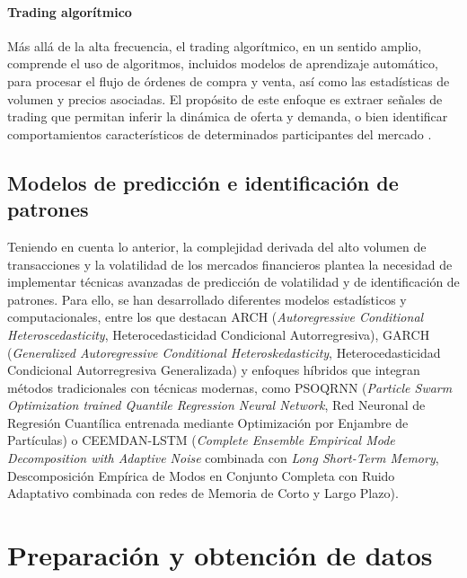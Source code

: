 \documentclass[12pt]{paper}
\begin{document}
\paragraph{Trading algorítmico}
Más allá de la alta frecuencia, el trading algorítmico, en un sentido amplio, comprende el uso de algoritmos, incluidos modelos de aprendizaje automático, para procesar el flujo de órdenes de compra y venta, así como las estadísticas de volumen y precios asociadas. El propósito de este enfoque es extraer señales de trading que permitan inferir la dinámica de oferta y demanda, o bien identificar comportamientos característicos de determinados participantes del mercado \cite{jansen2020machine}.

\subsection[Modelos de predicción e identificación de patrones]{Modelos de predicción e identificación de patrones}
\label{sec:modelos-prediccion}
Teniendo en cuenta lo anterior, la complejidad derivada del alto volumen de transacciones y la volatilidad de los mercados financieros plantea la necesidad de implementar técnicas avanzadas de predicción de volatilidad y de identificación de patrones. Para ello, se han desarrollado diferentes modelos estadísticos y computacionales, entre los que destacan ARCH (\textit{Autoregressive Conditional Heteroscedasticity}, Heterocedasticidad Condicional Autorregresiva), GARCH (\textit{Generalized Autoregressive Conditional Heteroskedasticity}, Heterocedasticidad Condicional Autorregresiva Generalizada) y enfoques híbridos que integran métodos tradicionales con técnicas modernas, como PSOQRNN (\textit{Particle Swarm Optimization trained Quantile Regression Neural Network}, Red Neuronal de Regresión Cuantílica entrenada mediante Optimización por Enjambre de Partículas) o CEEMDAN-LSTM (\textit{Complete Ensemble Empirical Mode Decomposition with Adaptive Noise} combinada con \textit{Long Short-Term Memory}, Descomposición Empírica de Modos en Conjunto Completa con Ruido Adaptativo combinada con redes de Memoria de Corto y Largo Plazo).


\section{Preparación y obtención de datos}
\end{document}
